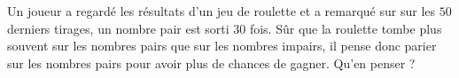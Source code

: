
\begin{exercice}\label{exosmath-0680}

    Un joueur a regardé les résultats d'un jeu de roulette et a remarqué sur sur les \( 50\) derniers tirages, un nombre pair est sorti \( 30\) fois. Sûr que la roulette tombe plus souvent sur les nombres pairs que sur les nombres impairs, il pense donc parier sur les nombres pairs pour avoir plus de chances de gagner. Qu'en penser ?

\end{exercice}
